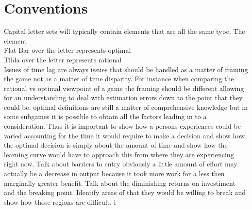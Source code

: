\documentclass[]{article}
\begin{document}
\section*{Conventions}
Capital letter sets will typically contain elements that are all the same type. The element
\\ Flat Bar over the letter represents optimal
\\ Tilda over the letter represents rational 
\\ Issues of time lag are always issues that should be handled as a matter of framing the game not as a matter of time disparity. For instance when comparing the rational vs optimal viewpoint of a game the framing should be different allowing for an understanding to deal with estimation errors down to the point that they could be. optimal definitions are still a matter of comprehensive knowledge but in some subgames it is possible to obtain all the factors leading in to a consideration. Thus it is important to show how a persons experiences could be varied accounting for the time it would require to make a decision and show how the optimal decision is simply about the amount of time and show how the learning curve would have to approach this from where they are experiencing right now. Talk about barriers to entry obviously a little amount of effort may actually be a decrease in output because it took more work for a less then marginally greater benefit. Talk about the diminishing returns on investiment and the breaking point. Identify areas of that they would be willing to break and show how those regions are difficult. l   
\end{document}

